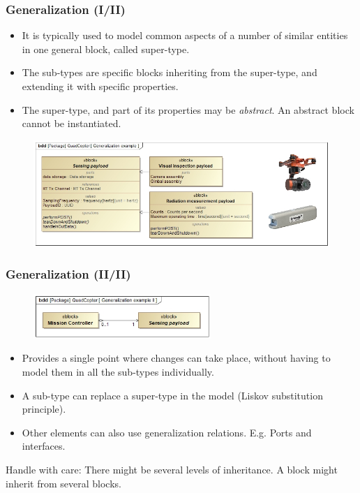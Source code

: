 \documentclass[xcolor=dvipsnames,t]{beamer}
\begin{document}
\begin{frame}
\frametitle{Generalization (I/II)}
\begin{itemize}
\item It is typically used to model common aspects of a number of similar entities in one general block, called super-type.
\item The sub-types are specific blocks inheriting from the super-type, and extending it with specific properties.
\item The super-type, and part of its properties may be \textit{abstract}. An abstract block cannot be instantiated.
\end{itemize}

\begin{figure}
 	\includegraphics[width=\textwidth]{GeneralizationDetailed.jpg}
\end{figure}
\end{frame}




\begin{frame}
\frametitle{Generalization (II/II)}
\begin{figure}
 	\includegraphics[width=0.6\textwidth]{GeneralizationExampleClient.jpg}
\end{figure}

\begin{itemize}
\item Provides a single point where changes can take place, without having to model them in all the sub-types individually.
\item A sub-type can replace a super-type in the model (Liskov substitution principle).
\item Other elements can also use generalization relations. E.g. Ports and interfaces.
\end{itemize}

Handle with care:\newline
\danger There might be several levels of inheritance.\newline
\danger A block might inherit from several blocks.
\end{frame}
\end{document}
